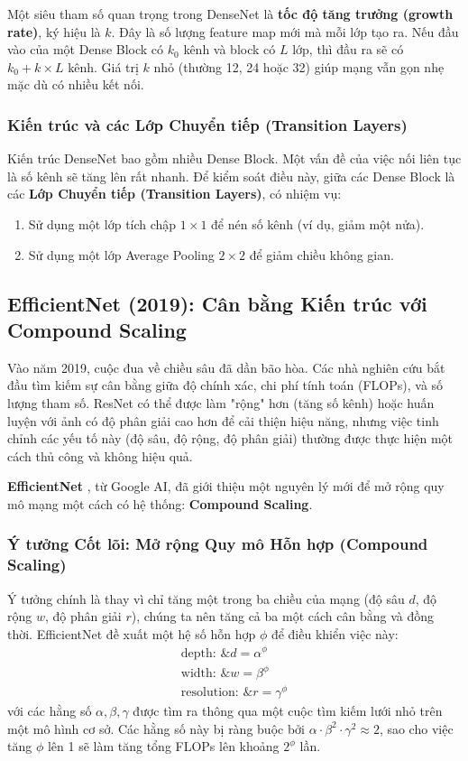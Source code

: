 Một siêu tham số quan trọng trong DenseNet là \textbf{tốc độ tăng trưởng (growth rate)}, 
ký hiệu là $k$. Đây là số lượng feature map mới mà mỗi lớp tạo ra. 
Nếu đầu vào của một Dense Block có $k_0$ kênh và block có $L$ lớp, 
thì đầu ra sẽ có $k_0 + k \times L$ kênh. 
Giá trị $k$ nhỏ (thường 12, 24 hoặc 32) giúp mạng vẫn gọn nhẹ mặc dù có nhiều kết nối.

\subsubsection{Kiến trúc và các Lớp Chuyển tiếp (Transition Layers)}
Kiến trúc DenseNet bao gồm nhiều Dense Block. Một vấn đề của việc nối liên tục là số kênh sẽ tăng lên rất nhanh. Để kiểm soát điều này, giữa các Dense Block là các \textbf{Lớp Chuyển tiếp (Transition Layers)}, có nhiệm vụ:
\begin{enumerate}
	\item Sử dụng một lớp tích chập $1 \times 1$ để nén số kênh (ví dụ, giảm một nửa).
	\item Sử dụng một lớp Average Pooling $2 \times 2$ để giảm chiều không gian.
\end{enumerate}

\subsection{EfficientNet (2019): Cân bằng Kiến trúc với Compound Scaling}
\label{subsec:efficientnet}
Vào năm 2019, cuộc đua về chiều sâu đã dần bão hòa. Các nhà nghiên cứu bắt đầu tìm kiếm sự cân bằng giữa độ chính xác, chi phí tính toán (FLOPs), và số lượng tham số. ResNet có thể được làm "rộng" hơn (tăng số kênh) hoặc huấn luyện với ảnh có độ phân giải cao hơn để cải thiện hiệu năng, nhưng việc tinh chỉnh các yếu tố này (độ sâu, độ rộng, độ phân giải) thường được thực hiện một cách thủ công và không hiệu quả.

\textbf{EfficientNet} \cite{Tan2019}, từ Google AI, đã giới thiệu một nguyên lý mới để mở rộng quy mô mạng một cách có hệ thống: \textbf{Compound Scaling}.

\subsubsection{Ý tưởng Cốt lõi: Mở rộng Quy mô Hỗn hợp (Compound Scaling)}
\label{subsubsec:efficientnet_scaling}
Ý tưởng chính là thay vì chỉ tăng một trong ba chiều của mạng (độ sâu $d$, độ rộng $w$, độ phân giải $r$), chúng ta nên tăng cả ba một cách cân bằng và đồng thời. EfficientNet đề xuất một hệ số hỗn hợp $\phi$ để điều khiển việc này:
\begin{align}
	\text{depth: }\& d = \alpha^\phi \\
	\text{width: }\& w = \beta^\phi \\
	\text{resolution: }\& r = \gamma^\phi
\end{align}
với các hằng số $\alpha, \beta, \gamma$ được tìm ra thông qua một cuộc tìm kiếm lưới nhỏ trên một mô hình cơ sở. Các hằng số này bị ràng buộc bởi $\alpha \cdot \beta^2 \cdot \gamma^2 \approx 2$, sao cho việc tăng $\phi$ lên 1 sẽ làm tăng tổng FLOPs lên khoảng $2^\phi$ lần.

